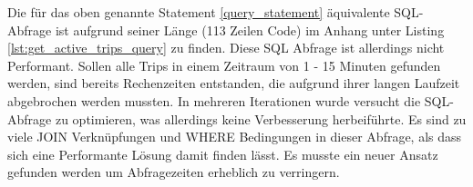   Die für das oben genannte Statement \ref{query_statement} äquivalente SQL-Abfrage ist aufgrund seiner Länge (113 Zeilen Code) im Anhang unter Listing \ref{lst:get_active_trips_query} zu finden. Diese SQL Abfrage ist allerdings nicht Performant. Sollen alle Trips in einem Zeitraum von 1 - 15 Minuten gefunden werden, sind bereits Rechenzeiten entstanden, die aufgrund ihrer langen Laufzeit abgebrochen werden mussten. In mehreren Iterationen wurde versucht die SQL-Abfrage zu optimieren, was allerdings keine Verbesserung herbeiführte. Es sind zu viele JOIN Verknüpfungen und WHERE Bedingungen in dieser Abfrage, als dass sich eine Performante Lösung damit finden lässt. Es musste ein neuer Ansatz gefunden werden um Abfragezeiten erheblich zu verringern.


